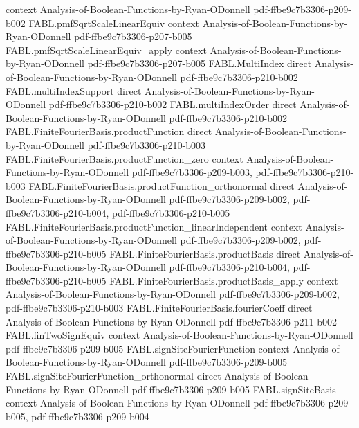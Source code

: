 \begin{theorem}
  {context}
  {Analysis-of-Boolean-Functions-by-Ryan-ODonnell}
  {pdf-ffbe9c7b3306-p209-b002}
\proofstep
  {FABL.pmfSqrtScaleLinearEquiv}
  {context}
  {Analysis-of-Boolean-Functions-by-Ryan-ODonnell}
  {pdf-ffbe9c7b3306-p207-b005}
\proofstep
  {FABL.pmfSqrtScaleLinearEquiv_apply}
  {context}
  {Analysis-of-Boolean-Functions-by-Ryan-ODonnell}
  {pdf-ffbe9c7b3306-p207-b005}
\proofstep
  {FABL.MultiIndex}
  {direct}
  {Analysis-of-Boolean-Functions-by-Ryan-ODonnell}
  {pdf-ffbe9c7b3306-p210-b002}
\proofstep
  {FABL.multiIndexSupport}
  {direct}
  {Analysis-of-Boolean-Functions-by-Ryan-ODonnell}
  {pdf-ffbe9c7b3306-p210-b002}
\proofstep
  {FABL.multiIndexOrder}
  {direct}
  {Analysis-of-Boolean-Functions-by-Ryan-ODonnell}
  {pdf-ffbe9c7b3306-p210-b002}
\proofstep
  {FABL.FiniteFourierBasis.productFunction}
  {direct}
  {Analysis-of-Boolean-Functions-by-Ryan-ODonnell}
  {pdf-ffbe9c7b3306-p210-b003}
\proofstep
  {FABL.FiniteFourierBasis.productFunction_zero}
  {context}
  {Analysis-of-Boolean-Functions-by-Ryan-ODonnell}
  {pdf-ffbe9c7b3306-p209-b003,
    pdf-ffbe9c7b3306-p210-b003}
\proofstep
  {FABL.FiniteFourierBasis.productFunction_orthonormal}
  {direct}
  {Analysis-of-Boolean-Functions-by-Ryan-ODonnell}
  {pdf-ffbe9c7b3306-p209-b002,
    pdf-ffbe9c7b3306-p210-b004,
    pdf-ffbe9c7b3306-p210-b005}
\proofstep
  {FABL.FiniteFourierBasis.productFunction_linearIndependent}
  {context}
  {Analysis-of-Boolean-Functions-by-Ryan-ODonnell}
  {pdf-ffbe9c7b3306-p209-b002,
    pdf-ffbe9c7b3306-p210-b005}
\proofstep
  {FABL.FiniteFourierBasis.productBasis}
  {direct}
  {Analysis-of-Boolean-Functions-by-Ryan-ODonnell}
  {pdf-ffbe9c7b3306-p210-b004,
    pdf-ffbe9c7b3306-p210-b005}
\proofstep
  {FABL.FiniteFourierBasis.productBasis_apply}
  {context}
  {Analysis-of-Boolean-Functions-by-Ryan-ODonnell}
  {pdf-ffbe9c7b3306-p209-b002,
    pdf-ffbe9c7b3306-p210-b003}
\proofstep
  {FABL.FiniteFourierBasis.fourierCoeff}
  {direct}
  {Analysis-of-Boolean-Functions-by-Ryan-ODonnell}
  {pdf-ffbe9c7b3306-p211-b002}
\proofstep
  {FABL.finTwoSignEquiv}
  {context}
  {Analysis-of-Boolean-Functions-by-Ryan-ODonnell}
  {pdf-ffbe9c7b3306-p209-b005}
\proofstep
  {FABL.signSiteFourierFunction}
  {context}
  {Analysis-of-Boolean-Functions-by-Ryan-ODonnell}
  {pdf-ffbe9c7b3306-p209-b005}
\proofstep
  {FABL.signSiteFourierFunction_orthonormal}
  {direct}
  {Analysis-of-Boolean-Functions-by-Ryan-ODonnell}
  {pdf-ffbe9c7b3306-p209-b005}
\proofstep
  {FABL.signSiteBasis}
  {context}
  {Analysis-of-Boolean-Functions-by-Ryan-ODonnell}
  {pdf-ffbe9c7b3306-p209-b005,
    pdf-ffbe9c7b3306-p209-b004}

\end{theorem}
